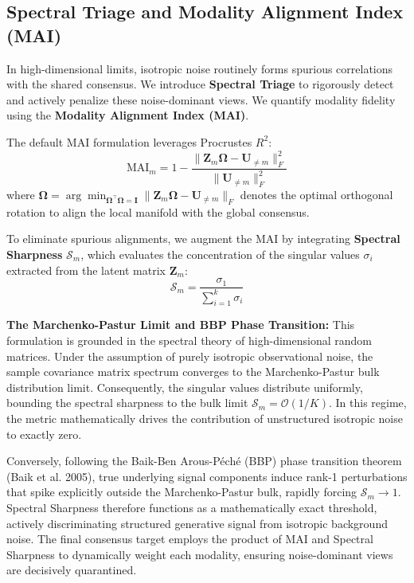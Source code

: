 \documentclass[
  letterpaper,
]{report}
\begin{document}
\subsection{Spectral Triage and Modality Alignment Index
(MAI)}\label{spectral-triage-and-modality-alignment-index-mai}

In high-dimensional limits, isotropic noise routinely forms spurious
correlations with the shared consensus. We introduce \textbf{Spectral
Triage} to rigorously detect and actively penalize these noise-dominant
views. We quantify modality fidelity using the \textbf{Modality
Alignment Index (MAI)}.

The default MAI formulation leverages Procrustes \(R^2\):
\[ \text{MAI}_m = 1 - \frac{\|\mathbf{Z}_m \mathbf{\Omega} - \mathbf{U}_{\neq m}\|_F^2}{\|\mathbf{U}_{\neq m}\|_F^2} \]
where
\(\mathbf{\Omega} = \arg\min_{\mathbf{\Omega}^\top \mathbf{\Omega} = \mathbf{I}} \|\mathbf{Z}_m \mathbf{\Omega} - \mathbf{U}_{\neq m}\|_F\)
denotes the optimal orthogonal rotation to align the local manifold with
the global consensus.

To eliminate spurious alignments, we augment the MAI by integrating
\textbf{Spectral Sharpness} \(\mathcal{S}_m\), which evaluates the
concentration of the singular values \(\sigma_i\) extracted from the
latent matrix \(\mathbf{Z}_m\):
\[ \mathcal{S}_m = \frac{\sigma_1}{\sum_{i=1}^k \sigma_i} \]

\textbf{The Marchenko-Pastur Limit and BBP Phase Transition:} This
formulation is grounded in the spectral theory of high-dimensional
random matrices. Under the assumption of purely isotropic observational
noise, the sample covariance matrix spectrum converges to the
Marchenko-Pastur bulk distribution limit. Consequently, the singular
values distribute uniformly, bounding the spectral sharpness to the bulk
limit \(\mathcal{S}_m = \mathcal{O}(1/K)\). In this regime, the metric
mathematically drives the contribution of unstructured isotropic noise
to exactly zero.

Conversely, following the Baik-Ben Arous-Péché (BBP) phase transition
theorem (Baik et al. 2005), true underlying signal components induce
rank-1 perturbations that spike explicitly outside the Marchenko-Pastur
bulk, rapidly forcing \(\mathcal{S}_m \to 1\). Spectral Sharpness
therefore functions as a mathematically exact threshold, actively
discriminating structured generative signal from isotropic background
noise. The final consensus target employs the product of MAI and
Spectral Sharpness to dynamically weight each modality, ensuring
noise-dominant views are decisively quarantined.
\end{document}
